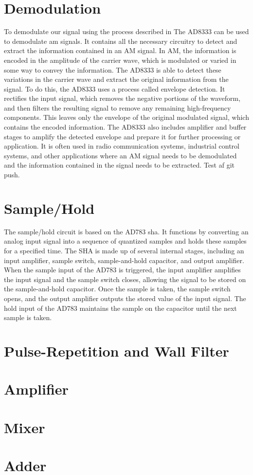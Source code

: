 \section{Demodulation}
To demodulate our signal using the process described in The AD8333\cite{AD8333} can be used to demodulate \gls{am} signals. It contains all the necessary circuitry to detect and extract the information contained in an AM signal. In AM, the information is encoded in the amplitude of the carrier wave, which is modulated or varied in some way to convey the information. The AD8333 is able to detect these variations in the carrier wave and extract the original information from the signal. To do this, the AD8333 uses a process called envelope detection. It rectifies the input signal, which removes the negative portions of the waveform, and then filters the resulting signal to remove any remaining high-frequency components. This leaves only the envelope of the original modulated signal, which contains the encoded information. The AD8333 also includes amplifier and buffer stages to amplify the detected envelope and prepare it for further processing or application. It is often used in radio communication systems, industrial control systems, and other applications where an AM signal needs to be demodulated and the information contained in the signal needs to be extracted. Test af git push.
\section{Sample/Hold}
The sample/hold circuit is based on the AD783\cite{AD783} \gls{sha}. It functions by converting an analog input signal into a sequence of \gls{quantized} samples and holds these samples for a specified time. The SHA is made up of several internal stages, including an input amplifier, sample switch, sample-and-hold capacitor, and output amplifier. When the sample input of the AD783 is triggered, the input amplifier amplifies the input signal and the sample switch closes, allowing the signal to be stored on the sample-and-hold capacitor. Once the sample is taken, the sample switch opens, and the output amplifier outputs the stored value of the input signal. The hold input of the AD783 maintains the sample on the capacitor until the next sample is taken.
\section{Pulse-Repetition and Wall Filter}

\section{Amplifier}

\section{Mixer}

\section{Adder}